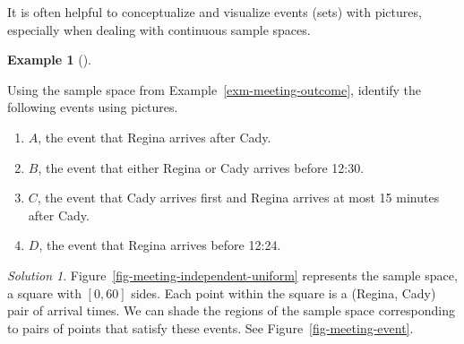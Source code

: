 \documentclass[
  letterpaper,
  DIV=11,
  numbers=noendperiod]{scrreprt}
\providecommand{\tightlist}{%
  \setlength{\itemsep}{0pt}\setlength{\parskip}{0pt}}
\theoremstyle{plain}
\theoremstyle{definition}
\newtheorem{example}{Example}[chapter]
\theoremstyle{definition}
\theoremstyle{definition}
\theoremstyle{remark}
\newtheorem{refsolution}{Solution}[chapter]
\begin{document}
It is often helpful to conceptualize and visualize events (sets) with
pictures, especially when dealing with continuous sample spaces.

\begin{tcolorbox}[enhanced jigsaw, opacityback=0, left=2mm, colframe=quarto-callout-note-color-frame, toprule=.15mm, breakable, colback=white, leftrule=.75mm, arc=.35mm, rightrule=.15mm, bottomrule=.15mm]

\begin{example}[]\protect\hypertarget{exm-meeting-event}{}\label{exm-meeting-event}

Using the sample space from Example~\ref{exm-meeting-outcome}, identify
the following events using pictures.

\begin{enumerate}
\def\labelenumi{\arabic{enumi}.}
\tightlist
\item
  \(A\), the event that Regina arrives after Cady.
\item
  \(B\), the event that either Regina or Cady arrives before 12:30.
\item
  \(C\), the event that Cady arrives first and Regina arrives at most 15
  minutes after Cady.
\item
  \(D\), the event that Regina arrives before 12:24.
\end{enumerate}

\end{example}

\end{tcolorbox}

\begin{tcolorbox}[enhanced jigsaw, opacityback=0, rightrule=.15mm, coltitle=black, colframe=quarto-callout-tip-color-frame, toprule=.15mm, colbacktitle=quarto-callout-tip-color!10!white, opacitybacktitle=0.6, left=2mm, toptitle=1mm, breakable, title={Solution (click to expand)}, bottomtitle=1mm, colback=white, leftrule=.75mm, titlerule=0mm, arc=.35mm, bottomrule=.15mm]

\begin{refsolution}
Figure~\ref{fig-meeting-independent-uniform} represents the sample
space, a square with \([0, 60]\) sides. Each point within the square is
a (Regina, Cady) pair of arrival times. We can shade the regions of the
sample space corresponding to pairs of points that satisfy these events.
See Figure~\ref{fig-meeting-event}.

\label{sol-meeting-event}

\end{refsolution}

\end{tcolorbox}
\end{document}
